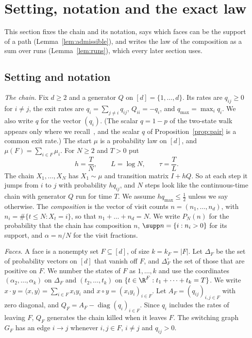 \section{Setting, notation and the exact law}\label{sec:model}

This section fixes the chain and its notation, says which faces can be the support of a path
(Lemma~\ref{lem:admissible}), and writes the law of the composition as a sum over runs
(Lemma~\ref{lem:runs}), which every later section uses.

\subsection{Setting and notation}\label{sec:notation}

\emph{The chain.} Fix $d\ge2$ and a generator $Q$ on $[d]=\{1,\dots,d\}$. Its
rates are $q_{ij}\ge0$ for $i\ne j$, the exit rates are $q_i=\sum_{j\ne i}q_{ij}$,
$Q_{ii}=-q_i$, and $q_{\max}=\max_iq_i$. We also write $q$ for the vector
$(q_i)$. (The scalar $q=1-p$ of the two-state
walk appears only where we recall~\cite{paperA}, and the scalar $q$ of
Proposition~\ref{prop:pair} is a common exit rate.) The start
$\mu$ is a probability law on $[d]$, and $\mu(F)=\sum_{i\in F}\mu_i$. For $N\ge2$
and $T>0$ put
\[
 h=\frac TN,\qquad L=\log N,\qquad \tau=\frac TL .
\]
The chain $X_1,\dots,X_N$ has $X_1\sim\mu$ and transition matrix $I+hQ$. So at
each step it jumps from $i$ to $j$ with probability $hq_{ij}$, and $N$ steps
look like the continuous-time chain with generator $Q$ run for time $T$. We
assume $hq_{\max}\le\frac12$ unless we say otherwise. The \emph{composition} is
the vector of visit counts $n=(n_1,\dots,n_d)$, with
$n_i=\#\{t\le N:X_t=i\}$, so that $n_1+\dots+n_d=N$. We write $P_N(n)$ for the
probability that the chain has composition $n$, $\supp n=\{i:n_i>0\}$ for its
support, and $\alpha=n/N$ for the visit fractions.

\emph{Faces.} A face is a nonempty set $F\subseteq[d]$, of size
$k=k_F=\lvert F\rvert$. Let $\Delta_F$ be the set of probability vectors on
$[d]$ that vanish off $F$, and $\Delta_F^\circ$ the set of those that are
positive on $F$. We number the states of $F$ as $1,\dots,k$ and use the
coordinates $(\alpha_2,\dots,\alpha_k)$ on $\Delta_F$ and $(t_2,\dots,t_k)$ on
$\{t\in\R^F:t_1+\dots+t_k=T\}$. We write $x\cdot y=\langle x,y\rangle
=\sum_{i\in F}x_iy_i$ and $x\circ y=(x_iy_i)_{i\in F}$. Let
$A_F=(q_{ij})_{i,j\in F}$ with zero diagonal, and $Q_F=A_F-\operatorname{diag}
(q_i)_{i\in F}$. Since $q_i$ includes the rates of leaving $F$, $Q_F$ generates
the chain killed when it leaves $F$. The switching graph $G_F$ has an edge
$i\to j$ whenever $i,j\in F$, $i\ne j$ and $q_{ij}>0$.

